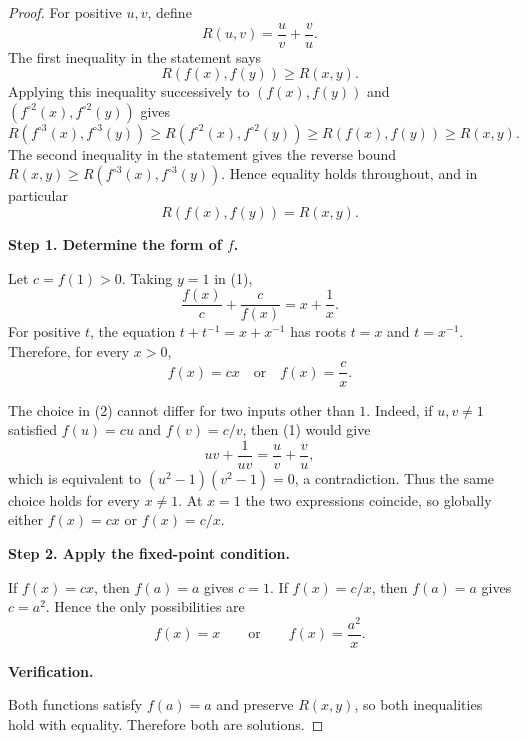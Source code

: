 
\begin{dlsummary}[title={\bfseries Solution 16. The Iterated Ratio Squeeze},breakable]

\begin{proof}
For positive $u,v$, define
\[
R(u,v)=\frac uv+\frac vu.
\]
The first inequality in the statement says
\[
R(f(x),f(y))\geq R(x,y).
\]
Applying this inequality successively to
$(f(x),f(y))$ and $(f^{\circ2}(x),f^{\circ2}(y))$ gives
\[
R(f^{\circ3}(x),f^{\circ3}(y))
\geq R(f^{\circ2}(x),f^{\circ2}(y))
\geq R(f(x),f(y))
\geq R(x,y).
\]
The second inequality in the statement gives the reverse bound
$R(x,y)\geq R(f^{\circ3}(x),f^{\circ3}(y))$. Hence equality holds
throughout, and in particular
\[
R(f(x),f(y))=R(x,y). \tag{1}
\]

\medskip
\noindent
\textbf{Step 1. Determine the form of $f$.}

Let $c=f(1)>0$. Taking $y=1$ in (1),
\[
\frac{f(x)}c+\frac c{f(x)}=x+\frac1x.
\]
For positive $t$, the equation $t+t^{-1}=x+x^{-1}$ has roots
$t=x$ and $t=x^{-1}$. Therefore, for every $x>0$,
\[
f(x)=cx\quad\text{or}\quad f(x)=\frac cx. \tag{2}
\]

The choice in (2) cannot differ for two inputs other than $1$. Indeed,
if $u,v\ne1$ satisfied $f(u)=cu$ and $f(v)=c/v$, then (1) would give
\[
uv+\frac1{uv}=\frac uv+\frac vu,
\]
which is equivalent to $(u^2-1)(v^2-1)=0$, a contradiction. Thus the
same choice holds for every $x\ne1$. At $x=1$ the two expressions
coincide, so globally either $f(x)=cx$ or $f(x)=c/x$.

\medskip
\noindent
\textbf{Step 2. Apply the fixed-point condition.}

If $f(x)=cx$, then $f(a)=a$ gives $c=1$. If $f(x)=c/x$, then
$f(a)=a$ gives $c=a^2$. Hence the only possibilities are
\[
f(x)=x\qquad\text{or}\qquad f(x)=\frac{a^2}{x}.
\]

\medskip
\noindent
\textbf{Verification.}

Both functions satisfy $f(a)=a$ and preserve $R(x,y)$, so both
inequalities hold with equality. Therefore both are solutions.
\end{proof}

\end{dlsummary}